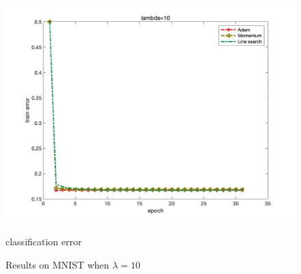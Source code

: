 \documentclass{article}
\begin{document}
\begin{figure}[H]
\begin{minipage}{0.33\linewidth}
			\includegraphics[width=1\linewidth]{./fig/err_m1}
			\caption{classification error}
		\end{minipage}
	\caption*{Results on MNIST when $\lambda=10$}
	\end{figure}
\end{document}
